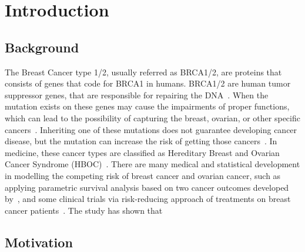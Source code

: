 \chapter{Introduction}
\section{Background}
The Breast Cancer type 1/2, usually referred as BRCA1/2, are proteins that consists of genes that code for BRCA1 in humans. BRCA1/2 are human tumor suppressor genes, that are responsible for repairing the DNA~\cite{duncan1998brca1}. 
When the mutation exists on these genes may cause the impairments of proper functions, which can lead to the possibility of capturing the breast, ovarian, or other specific cancers~\cite{greer2006role, haffty2002outcome, huang2018association}. 
Inheriting one of these mutations does not guarantee developing cancer disease, but the mutation can increase the risk of getting those cancers~\cite{friedenson2007brca1}. 
In medicine, these cancer types are classified as Hereditary Breast and Ovarian Cancer Syndrome (HBOC)~\cite{lux2006hereditary}. 
There are many medical and statistical development in modelling the competing risk of breast cancer and ovarian cancer, such as applying parametric survival analysis based on two cancer outcomes developed by~\citet{choi2021competing}, and some clinical trials via risk-reducing approach of treatments on breast cancer patients~\cite{choi2021association}.
The study has shown that 

\section{Motivation}


